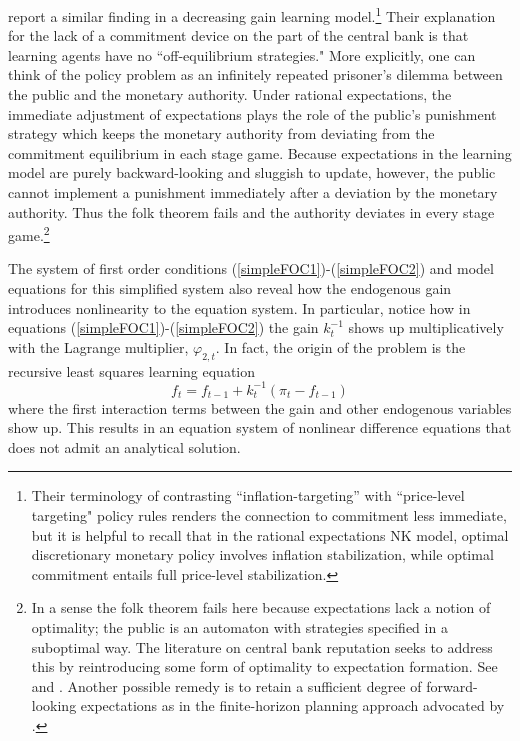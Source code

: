 \documentclass[11pt]{article}
\renewcommand{\[}{\begin{equation}}
\renewcommand{\]}{\end{equation}}
\begin{document}
\cite{mele2019perils} report a similar finding in a decreasing gain learning model.\footnote{Their terminology of contrasting ``inflation-targeting'' with ``price-level targeting" policy rules renders the connection to commitment less immediate, but it is helpful to recall that in the rational expectations NK model, optimal discretionary monetary policy involves inflation stabilization, while optimal commitment entails full price-level stabilization.} Their explanation for the lack of a commitment device on the part of the central bank is that learning agents have no ``off-equilibrium strategies." More explicitly, one can think of the policy problem as an infinitely repeated prisoner's dilemma between the public and the monetary authority. Under rational expectations, the immediate adjustment of expectations plays the role of the public's punishment strategy which keeps the monetary authority from deviating from the commitment equilibrium in each stage game. Because expectations in the learning model are purely backward-looking and sluggish to update, however, the public cannot implement a punishment immediately after a deviation by the monetary authority. Thus the folk theorem fails and the authority deviates in every stage game.\footnote{In a sense the folk theorem fails here because expectations lack a notion of optimality; the public is an automaton with strategies specified in a suboptimal way. The literature on central bank reputation seeks to address this by reintroducing some form of optimality to expectation formation. See \cite{cho1995induction} and \cite{ireland2000expectations}. Another possible remedy is to retain a sufficient degree of forward-looking expectations as in the finite-horizon planning approach advocated by \cite{woodford2019monetary}.} 

The system of first order conditions (\ref{simpleFOC1})-(\ref{simpleFOC2}) and model equations for this simplified system also reveal how the endogenous gain introduces nonlinearity to the equation system. In particular, notice how in equations (\ref{simpleFOC1})-(\ref{simpleFOC2}) the gain $k_t^{-1}$ shows up multiplicatively with the Lagrange multiplier, $\varphi_{2,t}$. In fact, the origin of the problem is the recursive least squares learning equation
\begin{equation}
f_t = f_{t-1} + k_t^{-1}(\pi_t - f_{t-1}) \label{simpleRLS}
\end{equation}
where the first interaction terms between the gain and other endogenous variables show up. This results in an equation system of nonlinear difference equations that does not admit an analytical solution. 
\end{document}
